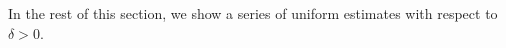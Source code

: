 \documentclass[reqno,a4paper,11pt]{amsart}
\theoremstyle{plain}
\numberwithin{equation}{section}
\begin{document}

In the rest of this section, we show a series of uniform estimates with respect to  $\delta>0$.
\end{document}
